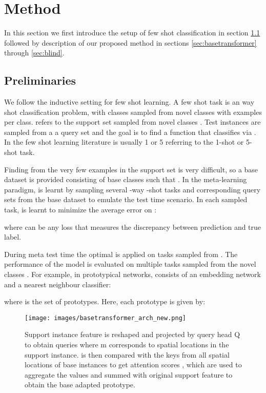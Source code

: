 \documentclass{bmvc2k}
\begin{document}
\section{Method}
In this section we first introduce the setup of few shot classification in section \ref{sec:preliminaries} followed by description of our proposed method in sections \ref{sec:basetransformer} through \ref{sec:blind}.

\subsection{Preliminaries} \label{sec:preliminaries}
We follow the inductive setting for few shot learning. A few shot task is an  way  shot classification problem, with  classes sampled from novel classes  with  examples per class.  refers to the support set sampled from novel classes .
Test instances  are sampled from a a query set  and the goal is to find a function  that classifies   via . In the few shot learning literature  is usually 1 or 5 referring to the 1-shot or 5-shot task.

Finding  from the very few examples in the support set is very difficult, so a base dataset is provided consisting of base classes  such that . In the meta-learning paradigm,  is learnt by sampling several -way -shot tasks  and corresponding query sets  from the base dataset to emulate the test time scenario. In each sampled task,  is learnt to  minimize the average error on :





where  can be any loss that measures the discrepancy between prediction and true label.

During meta test time the optimal  is applied on tasks sampled from . The performance of the model is evaluated on multiple tasks sampled from the novel classes .
For example, in prototypical networks,  consists of an embedding network  and a nearest neighbour classifier:

where  is the set of prototypes. Here, each prototype is given by: 

\begin{figure}
\centering
\texttt{[image: images/basetransformer\_arch\_new.png]}
\caption{Support instance feature  is reshaped and projected by query head Q to obtain queries  where m corresponds to spatial locations in the support instance.  is then compared with the keys  from all spatial locations  of base instances to get attention scores , which are used to aggregate the values  and summed with original support feature  to obtain the base adapted prototype.}
\label{fig:arch_image}
\end{figure}
\end{document}
